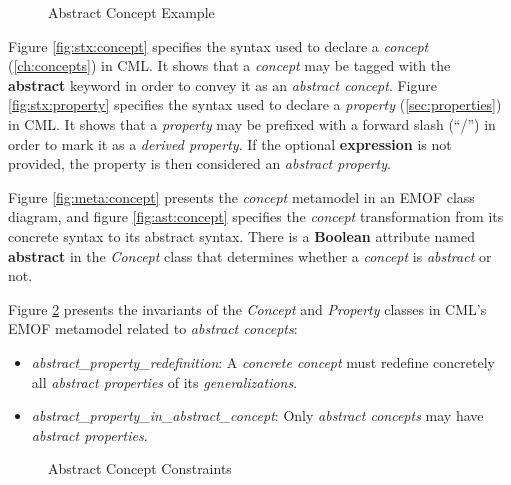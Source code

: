 \begin{figure}
\verbatimfont{\small}

\caption{Abstract Concept Example}
\label{fig:ex:abstract}
\end{figure}

\begin{concrete-syntax}
Figure \ref{fig:stx:concept} specifies the syntax used
to declare a \emph{concept} (\ref{ch:concepts}) in CML.
It shows that a \emph{concept} may be tagged with the \textbf{abstract} keyword
in order to convey it as an \emph{abstract concept}.
Figure \ref{fig:stx:property} specifies the syntax used 
to declare a \emph{property} (\ref{sec:properties}) in CML.
It shows that a \emph{property} may be prefixed with a forward slash (``/'')
in order to mark it as a \emph{derived property}.
If the optional \textbf{expression} is not provided,
the property is then considered an \emph{abstract property}.
\end{concrete-syntax}

\begin{abstract-syntax}
Figure \ref{fig:meta:concept} presents the \emph{concept} metamodel
in an EMOF \cite{mof} class diagram,
and figure \ref{fig:ast:concept} specifies
the \emph{concept} transformation
from its concrete syntax to its abstract syntax.
There is a \textbf{Boolean} attribute named \textbf{abstract} in the \emph{Concept} class
that determines whether a \emph{concept} is \emph{abstract} or not.
\end{abstract-syntax}

\begin{constraints}
Figure \ref{fig:ocl:abstract} presents the invariants
of the \emph{Concept} and \emph{Property} classes in CML's EMOF \cite{mof} metamodel
related to \emph{abstract concepts}:

\begin{itemize}

\item \emph{abstract\_property\_redefinition}:
A \emph{concrete concept} must redefine concretely all \emph{abstract properties} of 
its \emph{generalizations}.

\item \emph{abstract\_property\_in\_abstract\_concept}:
Only \emph{abstract concepts} may have \emph{abstract properties}.

\end{itemize}
\end{constraints}

\begin{figure}

\caption{Abstract Concept Constraints}
\label{fig:ocl:abstract}
\end{figure}

